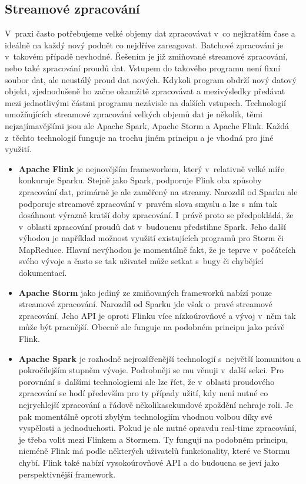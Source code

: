\documentclass[thesis=B,czech]{FITthesis}[2012/06/26]
\begin{document}
\subsection{Streamové zpracování}
	V~praxi často potřebujeme velké objemy dat zpracovávat v~co nejkratším čase a ideálně na každý nový podnět co nejdříve zareagovat. Batchové zpracování je v~takovém případě nevhodné. Řešením je již zmiňované streamové zpracování, nebo také zpracování proudů dat. Vstupem do takového programu není fixní soubor dat, ale neustálý proud dat nových. Kdykoli program obdrží nový datový objekt, zjednodušeně ho začne okamžitě zpracovávat a mezivýsledky předávat mezi jednotlivými částmi programu nezávisle na dalších vstupech. Technologií umožňujících streamové zpracování velkých objemů dat je několik, těmi nejzajímavějšími jsou ale Apache Spark, Apache Storm a Apache Flink. Každá z~těchto technologií funguje na trochu jiném principu a je vhodná pro jiné využití. 
	
\begin{itemize}
\item \textbf{Apache Flink} je nejnovějším frameworkem, který v~relativně velké míře konkuruje Sparku. Stejně jako Spark, podporuje Flink oba způsoby zpracování dat, primárně je ale zaměřený na streamy. Narozdíl od Sparku ale podporuje streamové zpracování v~pravém slova smyslu a lze s~ním tak dosáhnout výrazně kratší doby zpracování\cite{streaming-benchmark}. I~právě proto se předpokládá, že v~oblasti zpracování proudů dat v~budoucnu předstihne Spark\cite{flink-future}. Jeho další výhodou je například možnost využití existujících programů pro Storm či MapReduce. Hlavní nevýhodou je momentálně fakt, že je teprve v~počátcích svého vývoje a často se tak uživatel může setkat s~bugy či chybějící dokumentací. 
	
\item \textbf{Apache Storm} jako jediný ze zmiňovaných frameworků nabízí pouze streamové zpracování. Narozdíl od Sparku jde však o~pravé streamové zpracování. Jeho API je oproti Flinku více nízkoúrovňové a vývoj v~něm tak může být pracnější. Obecně ale funguje na podobném principu jako právě Flink. 
	
\item \textbf{Apache Spark} je rozhodně nejrozšířenější technologií s~největší komunitou a pokročilejším stupněm vývoje. Podrobněji se mu věnuji v~další sekci. Pro porovnání s~dalšími technologiemi ale lze říct, že v~oblasti proudového zpracování se hodí především pro ty případy užití, kdy není nutné co nejrychlejší zpracování a řádově několikasekundové zpoždění nehraje roli. Je pak momentálně oproti zbylým technologiím vhodnou volbou díky své vyspělosti a jednoduchosti. Pokud je ale nutné opravdu real-time zpracování, je třeba volit mezi Flinkem a Stormem. Ty fungují na podobném principu, nicméně Flink má podle některých uživatelů funkcionality, které ve Stormu chybí\cite{so-flink-storm}. Flink také nabízí vysokoúrovňové API a do budoucna se jeví jako perspektivnější framework. 
\end{itemize}		
	
\end{document}

